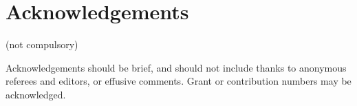 \documentclass[fleqn,10pt]{wlscirep}
\begin{document}
%
%
%
%





\section*{Acknowledgements} (not compulsory)

Acknowledgements should be brief, and should not include thanks to anonymous referees and editors, or effusive comments. Grant or contribution numbers may be acknowledged.
\end{document}
